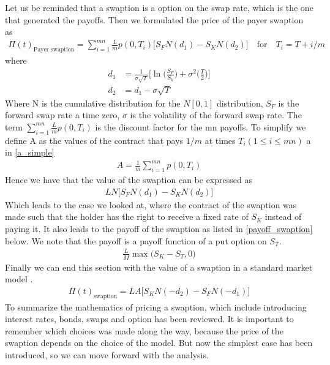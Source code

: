 Let us be reminded that a swaption is a option on the swap rate, which is the one that generated the payoffs.
Then we formulated the price of the payer swaption as \cite{Hull}
\begin{align*}
    \Pi(t)_{\text{Payer swaption}} = \sum_{i=1}^{mn} \frac{L}{m} p(0,T_i)\Big[ S_F N(d_1) - S_K N(d_2)\Big] \quad \text{for} \quad T_i= T+i/m  
\end{align*}
where
\begin{align*}
    d_1 & = \frac{1}{\sigma \sqrt{T}} \Big[ \ln \Big(\frac{S_F}{S_k}\Big)+\sigma^2\Big(\frac{T}{2}\Big)\Big] \\
    d_2 & = d_1-\sigma \sqrt{T}
\end{align*}
Where N is the cumulative distribution for the $N [0,1]$ distribution, $S_F$ is the forward swap rate a time
zero, $\sigma$ is the volatility of the forward swap rate. The term $\sum_{i=1}^{mn} \frac{L}{m} p(0,T_i)$ 
is the discount factor for the mn payoffs. To simplify we define A as the values of the contract that
pays $1/m$ at times $T_i ( 1\leq i \leq mn)$ a in \autoref{a_simple}
\begin{align}
    A= \frac{1}{m} \sum_{i=1}^{mn} p(0,T_i)
    \label{a_simple}
\end{align}
Hence we have that the value of the swaption can be expressed as 
\begin{align*}
    L N \Big[S_F N(d_1) - S_K N(d_2) \Big]
\end{align*}
Which leads to the case we looked at, where the contract of the swaption was made such that the 
holder has the right to receive a fixed rate of $S_K$ instead of paying it. It also leads to
the payoff of the swaption as listed in \autoref{payoff_swaption} below. We note that the payoff 
is a payoff function of a put option on $S_T$. 
\begin{align}
    \frac{L}{M} \max \Big( S_K - S_T, 0 \Big)
    \label{payoff_swaption}
\end{align}
Finally we can end this section with the value of a swaption in a standard market model \cite{Hull}.
\begin{align*}
    \Pi(t)_{\text{swaption}}= L A \Big[S_K N(-d_2) - S_F N(-d_1)\Big]
\end{align*}
To summarize the mathematics of pricing a swaption, which include introducing interest rates, 
bonds, swaps and option has been reviewed. It is important to remember which choices was made along the way,
because the price of the swaption depends on the choice of the model. But now the simplest case has been 
introduced, so we can move forward with the analysis. 